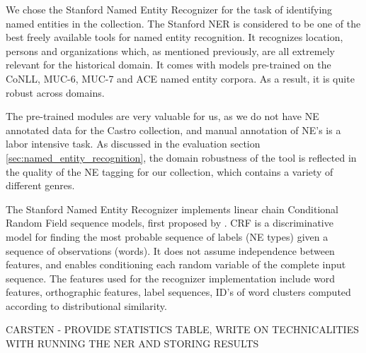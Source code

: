 
We chose the Stanford Named Entity Recognizer for the task of identifying named entities in the collection.
The Stanford NER is considered to be one of the best freely available tools for named entity recognition.
It recognizes location, persons and organizations which, as mentioned previously, are all extremely relevant for the historical domain. 
It comes with models pre-trained on the CoNLL, MUC-6, MUC-7 and ACE named entity corpora. As a result, it is quite robust across domains.

The pre-trained modules are very valuable for us, as we do not have NE annotated data for the Castro collection, and manual annotation of NE's is a labor intensive task. As discussed in the evaluation section \ref{sec:named_entity_recognition}, the domain robustness of the tool is reflected in the quality of the NE tagging for our collection, which contains a variety of different genres. 

The Stanford Named Entity Recognizer implements linear chain Conditional Random Field sequence models, first proposed by \cite{lafferty2001conditional}.
CRF is a discriminative model for finding the most probable sequence of labels (NE types) given a sequence of observations (words). 
It does not assume independence between features, and enables conditioning each random variable of the complete input sequence. The features used for the recognizer implementation include word features, orthographic features, label sequences, ID's of word clusters computed according to distributional similarity. 

CARSTEN - PROVIDE STATISTICS TABLE, WRITE ON TECHNICALITIES WITH RUNNING THE NER AND STORING RESULTS



